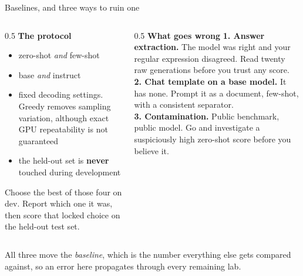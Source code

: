\documentclass[aspectratio=169,10pt]{beamer}
\begin{document}
\begin{frame}{Baselines, and three ways to ruin one}
  \begin{columns}[T]
    \begin{column}{0.5\textwidth}
      \textbf{The protocol}
      \begin{itemize}
        \item zero-shot \emph{and} few-shot
        \item base \emph{and} instruct
        \item fixed decoding settings. Greedy removes sampling variation,
          although exact GPU repeatability is not guaranteed
        \item the held-out set is \textbf{never} touched during development
      \end{itemize}
      \vspace{0.3em}
      Choose the best of those four on dev. Report which one it was, then score
      that locked choice on the held-out test set.
    \end{column}
    \begin{column}{0.5\textwidth}
      \textbf{What goes wrong}
      \vspace{0.3em}
      \small
      \textbf{1. Answer extraction.} The model was right and your regular
      expression disagreed. Read twenty raw generations before you trust any
      score.\\[0.4em]
      \textbf{2. Chat template on a base model.} It has none. Prompt it as a
      document, few-shot, with a consistent separator.\\[0.4em]
      \textbf{3. Contamination.} Public benchmark, public model. Go and
      investigate a suspiciously high zero-shot score before you believe it.
    \end{column}
  \end{columns}
  \vspace{0.4em}
  \raggedright
  \small
  All three move the \emph{baseline}, which is the number everything else gets
  compared against, so an error here propagates through every remaining lab.
\end{frame}
\end{document}

